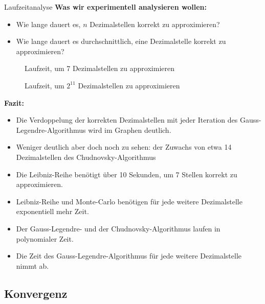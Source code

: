 \documentclass[9pt, t]{beamer}
\begin{document}
\begin{frame}[allowframebreaks]{Laufzeitanalyse}
    \textbf{Was wir experimentell analysieren wollen:}
    \begin{itemize}
        \item Wie lange dauert es, \(n\) Dezimalstellen korrekt zu
              approximieren?
        \item Wie lange dauert es durchschnittlich, eine Dezimalstelle korrekt
              zu approximieren?
    \end{itemize}
    \begin{figure}[H]
        \centering
        
        \caption{Laufzeit, um 7 Dezimalstellen zu approximieren}
    \end{figure}
    \framebreak
    \begin{figure}[H]
        \centering
        
        \caption{Laufzeit, um \(2^{11}\) Dezimalstellen zu approximieren}
    \end{figure}
    \textbf{Fazit:}
    \begin{itemize}
        \item Die Verdoppelung der korrekten Dezimalstellen mit jeder Iteration
              des Gauss-Legendre-Algorithmus wird im Graphen deutlich.
        \item Weniger deutlich aber doch noch zu sehen: der Zuwachs von etwa 14
              Dezimalstellen des Chudnovsky-Algorithmus
        \item Die Leibniz-Reihe benötigt über 10 Sekunden, um 7 Stellen korrekt
              zu approximieren.
        \item Leibniz-Reihe und Monte-Carlo benötigen für jede weitere
              Dezimalstelle exponentiell mehr Zeit.
        \item Der Gauss-Legendre- und der Chudnovsky-Algorithmus laufen in
              polynomialer Zeit.
        \item Die Zeit des Gauss-Legendre-Algorithmus für jede weitere
              Dezimalstelle nimmt ab.
    \end{itemize}
\end{frame}

\subsection{Konvergenz}
\end{document}
